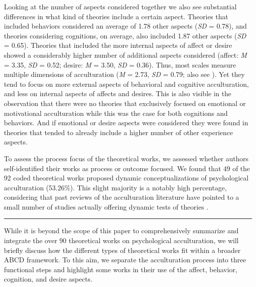 Looking at the number of aspects considered together we also see
substantial differences in what kind of theories include a certain
aspect. Theories that included behaviors considered an average of 1.78
other aspects (\textit{SD} = 0.78), and theories considering cognitions,
on average, also included 1.87 other aspects (\textit{SD} = 0.65).
Theories that included the more internal aspects of affect or desire
showed a considerably higher number of additional aspects considered
(affect: \textit{M} = 3.35, \textit{SD} = 0.52; desire: \textit{M} =
3.50, \textit{SD} = 0.36). Thus, most scales measure multiple dimensions
of acculturation (\textit{M} = 2.73, \textit{SD} = 0.79; also see
). Yet they tend to focus on more
external aspects of behavioral and cognitive acculturation, and less on
internal aspects of affects and desires. This is also visible in the
observation that there were no theories that exclusively focused on
emotional or motivational acculturation while this was the case for both
cognitions and behaviors. And if emotional or desire aspects were
considered they were found in theories that tended to already include a
higher number of other experience aspects.

\color{blue}

To assess the process focus of the theoretical works, we assessed
whether authors self-identified their works as process or outcome
focused. We found that 49 of the 92 coded theoretical works proposed
dynamic conceptualizations of psychological acculturation (53.26\%).
This slight majority is a notably high percentage, considering that past
reviews of the acculturation literature have pointed to a small number
of studies actually offering dynamic tests of theories
\citep[e.g.,][]{Brown2011, Ward2019}.

\begin{center}\rule{0.5\linewidth}{0.5pt}\end{center}

While it is beyond the scope of this paper to comprehensively summarize
and integrate the over 90 theoretical works on psychological
acculturation, we will briefly discuss how the different types of
theoretical works fit within a broader ABCD framework. To this aim, we
separate the acculturation process into three functional steps and
highlight some works in their use of the affect, behavior, cognition,
and desire aspects.

